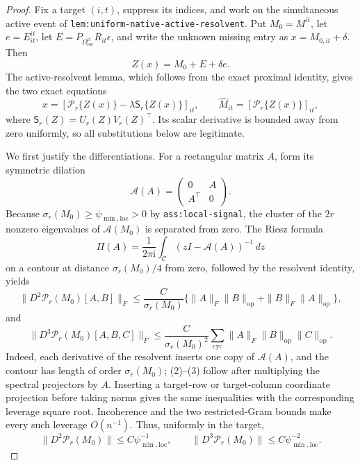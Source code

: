 \documentclass{article}
\begin{document}
\begin{proof}
Fix a target \((i,t)\), suppress its indices, and work on the simultaneous active event of \texttt{lem:uniform-native-active-resolvent}.  Put \(M_0=M^{it}\), let \(e=E^{it}_{it}\), let \(E=P_{\Omega_{\mathrm{loc}}^{it}}R_{it}\epsilon\), and write the unknown missing entry as \(x=M_{0,it}+\delta\).  Then
\[
 Z(x)=M_0+E+\delta e.
\]
The active-resolvent lemma, which follows from the exact proximal identity, gives the two exact equations
\[
 x=[\mathcal P_r\{Z(x)\}-\lambda\mathsf S_r\{Z(x)\}]_{it},
 \qquad
 \widehat M_{it}=[\mathcal P_r\{Z(x)\}]_{it},
 \tag{1}
\]
where \(\mathsf S_r(Z)=U_r(Z)V_r(Z)^{\top}\).  Its scalar derivative is bounded away from zero uniformly, so all substitutions below are legitimate.

We first justify the differentiations.  For a rectangular matrix \(A\), form its symmetric dilation
\[
 \mathscr A(A)=\begin{pmatrix}0&A\\A^{\top}&0\end{pmatrix}.
\]
Because \(\sigma_r(M_0)\ge\psi_{\min,\mathrm{loc}}>0\) by \texttt{ass:local-signal}, the cluster of the \(2r\) nonzero eigenvalues of \(\mathscr A(M_0)\) is separated from zero.  The Riesz formula
\[
 \Pi(A)=\frac{1}{2\pi\mathrm i}\int_{\mathcal C}
 (zI-\mathscr A(A))^{-1}\,dz
\]
on a contour at distance \(\sigma_r(M_0)/4\) from zero, followed by the resolvent identity, yields
\[
 \|D^2\mathcal P_r(M_0)[A,B]\|_F
 \le \frac{C}{\sigma_r(M_0)}
 \{\|A\|_F\|B\|_{\mathrm{op}}+\|B\|_F\|A\|_{\mathrm{op}}\},
 \tag{2}
\]
and
\[
 \|D^3\mathcal P_r(M_0)[A,B,C]\|_F
 \le \frac{C}{\sigma_r(M_0)^2}
 \sum_{\mathrm{cyc}}\|A\|_F\|B\|_{\mathrm{op}}\|C\|_{\mathrm{op}}.
 \tag{3}
\]
Indeed, each derivative of the resolvent inserts one copy of \(\mathscr A(A)\), and the contour has length of order \(\sigma_r(M_0)\); (2)--(3) follow after multiplying the spectral projectors by \(A\).  Inserting a target-row or target-column coordinate projection before taking norms gives the same inequalities with the corresponding leverage square root.  Incoherence and the two restricted-Gram bounds make every such leverage \(O(n^{-1})\).  Thus, uniformly in the target,
\[
 \|D^2\mathcal P_r(M_0)\|\le C\psi_{\min,\mathrm{loc}}^{-1},
 \qquad
 \|D^3\mathcal P_r(M_0)\|\le C\psi_{\min,\mathrm{loc}}^{-2}.
 \tag{4}
\]


\end{proof}
\end{document}
